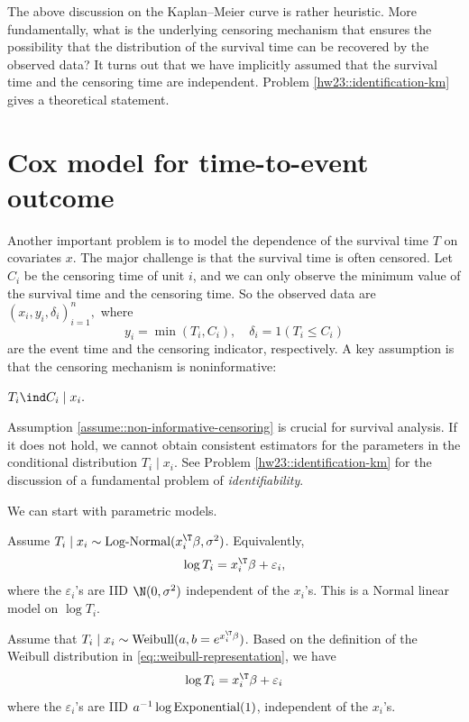 The above discussion on the Kaplan--Meier curve is rather heuristic. More fundamentally, what is the underlying censoring mechanism that ensures the possibility that the distribution of the survival time can be recovered by the observed data? It turns out that we have implicitly assumed that the survival time and the censoring time are independent. Problem \ref{hw23::identification-km} gives a theoretical statement. 



\section{Cox model for time-to-event outcome}



Another important problem is to model the dependence of the survival time $T$ on covariates $x$. The major challenge is that the survival time is often censored. Let $C_i$ be the censoring time of unit $i$, and we can only observe the minimum value of the survival time and the censoring time. So the observed data are
$
(x_{i}, y_{i},\delta_{i})_{i=1}^{n}, 
$
where 
\[
y_{i}=\min(T_{i},C_{i}),\quad\delta_{i}=1(T_{i}\leq C_{i})
\]
are the event time and the censoring indicator, respectively. A key assumption is that the censoring mechanism is noninformative:
\begin{assumption}
\label{assume::non-informative-censoring}
$
T_{i}\ind C_{i}\mid x_{i}.
$
\end{assumption}
Assumption \ref{assume::non-informative-censoring} is crucial for survival analysis. If it does not hold, we cannot obtain consistent estimators for the parameters in the conditional distribution $T_i \mid x_i$. See Problem \ref{hw23::identification-km} for the discussion of a fundamental problem of {\it identifiability}. 



We can start with parametric models. 

\begin{example}\label{ex::log-normal-regression}
Assume $T_i \mid x_i \sim \textup{Log-Normal}(x_i^{\T}\beta, \sigma^2)$. Equivalently,
$$
\log T_i = x_i^{\T}\beta + \varepsilon_i , 
$$
where the $\varepsilon_i$'s are IID $\N(0,\sigma^2)$ independent of the $x_i$'s. This is a Normal linear model on $\log T_i$. 
\end{example}
 
 
 \begin{example}\label{ex::weibull-regression}
 Assume that $T_i \mid x_i \sim \textup{Weibull}(a, b= e^{x_i^{\T}\beta})$. Based on the definition of the Weibull distribution in \eqref{eq::weibull-representation}, we have
 $$
 \log T_i = x_i^{\T} \beta+ \varepsilon_i
 $$
 where the $\varepsilon_i$'s are IID $a^{-1} \log \textup{Exponential}(1)$, independent of the $x_i$'s. 
 \end{example}

